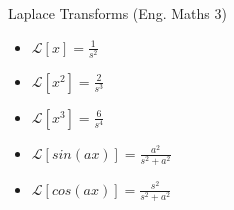 Laplace Transforms (Eng. Maths 3)

\begin{itemize}
\item $\mathcal{L}[x] = \frac{1}{s^2}$
\item $\mathcal{L}[x^2] = \frac{2}{s^3}$
\item $\mathcal{L}[x^3] = \frac{6}{s^4}$
\item $\mathcal{L}[sin(ax)] = \frac{a^2}{s^2 + a^2}$
\item $\mathcal{L}[cos(ax)] = \frac{s^2}{s^2 + a^2}$
\end{itemize}
